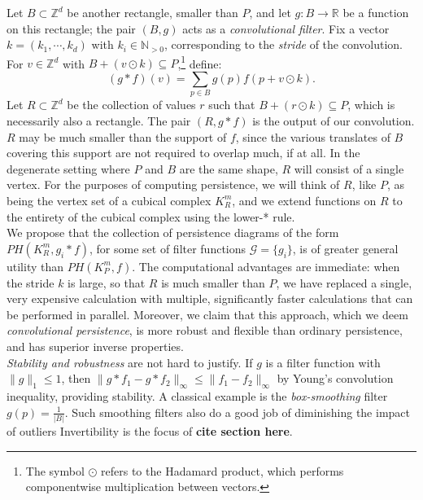\documentclass[conference]{IEEEtran}
\theoremstyle{definition}
\numberwithin{figure}{section}
\begin{document}
Let $B \subset \mathbb{Z}^d$ be another rectangle, smaller than $P$, and let $g: B \to \mathbb{R}$ be a function on this rectangle; the pair $(B,g)$ acts as a \emph{convolutional filter}. Fix a vector $k = (k_1, \cdots, k_d)$ with $k_i \in \mathbb{N}_{>0}$, corresponding to the \emph{stride} of the convolution. For $v \in \mathbb{Z}^d$ with $B + (v \odot k) \subseteq P$,\footnote{The symbol $\odot$ refers to the Hadamard product, which performs componentwise multiplication between vectors.} define:
\[(g \ast f)(v) = \sum_{p \in B} g(p)f(p+v \odot k).\]
Let $R \subset \mathbb{Z}^d$ be the collection of values $r$ such that $B + (r \odot k) \subseteq P$, which is necessarily also a rectangle. The pair $(R, g \ast f)$ is the output of our convolution. $R$ may be much smaller than the support of $f$, since the various translates of $B$ covering this support are not required to overlap much, if at all. In the degenerate setting where $P$ and $B$ are the same shape, $R$ will consist of a single vertex. For the purposes of computing persistence, we will think of $R$, like $P$, as being the vertex set of a cubical complex $K_{R}^{m}$, and we extend functions on $R$ to the entirety of the cubical complex using the lower-* rule.\\

We propose that the collection of persistence diagrams of the form $PH(K_{R}^{m},g_{i} \ast f)$, for some set of filter functions $\mathcal{G} = \{g_i\}$, is of greater general utility than $PH(K_{P}^{m},f)$. The computational advantages are immediate: when the stride $k$ is large, so that $R$ is much smaller than $P$, we have replaced a single, very expensive calculation with multiple, significantly faster calculations that can be performed in parallel. Moreover, we claim that this approach, which we deem \emph{convolutional persistence}, is more robust and flexible than ordinary persistence, and has superior inverse properties.\\



\emph{Stability and robustness} are not hard to justify. If $g$ is a filter function with $\|g\|_{1} \leq 1$, then $\|g \ast f_1 - g \ast f_2 \|_{\infty} \leq \|f_1 - f_2\|_{\infty}$ by Young's convolution inequality, providing stability. A classical example is the \emph{box-smoothing} filter $g(p) = \frac{1}{|B|}$. Such smoothing filters also do a good job of diminishing the impact of outliers Invertibility is the focus of {\bf cite section here}.\\
\end{document}
